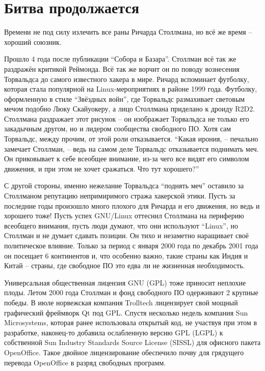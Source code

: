 

\chapter{Битва продолжается}

Времени не под силу излечить все раны Ричарда Столлмана, но всё же время -- хороший союзник.

Прошло 4 года после публикации \enquote{Собора и Базара}. Столлман всё так же раздражён критикой Реймонда. Всё так же ворчит он по поводу вознесения Торвальдса до самого известного хакера в мире. Ричард вспоминает футболку, которая стала популярной на Linux-мероприятиях в районе 1999 года. Футболку, оформленную в стиле \enquote{Звёздных войн}, где Торвальдс размахивает световым мечом подобно Люку Скайуокеру, а лицо Столлмана приделано к дроиду R2D2. Столлмана раздражает этот рисунок -- он изображает Торвальдса не только его закадычным другом, но и лидером сообщества свободного ПО. Хотя сам Торвальдс, между прочим, от этой роли отказывается. \enquote{Какая ирония, -- печально замечает Столлман, -- ведь на самом деле Торвальдс отказывается поднимать меч. Он приковывает к себе всеобщее внимание, из-за чего все видят его символом движения, и при этом не хочет сражаться. Что тут хорошего?}

С другой стороны, именно нежелание Торвальдса \enquote{поднять меч} оставило за Столлманом репутацию непримиримого стража хакерской этики. Пусть за последние годы произошло много плохого для Ричарда и его движения, но ведь и хорошего тоже! Пусть успех GNU/Linux оттеснил Столлмана на периферию всеобщего внимания, пусть люди думают, что они используют \enquote{Linux}, но Столлман и не думает сдавать позиции. Он тихо и незаметно наращивает своё политическое влияние. Только за период с января 2000 года по декабрь 2001 года он посещает 6 континентов и, что особенно важно, такие страны как Индия и Китай -- страны, где свободное ПО это едва ли не жизненная необходимость.

Универсальная общественная лицензия GNU (GPL) тоже приносит неплохие плоды. Летом 2000 года Столлман и фонд свободного ПО одерживают 2 крупные победы. В июле норвежская компания Trolltech лицензирует свой мощный графический фреймворк Qt под GPL. Спустя несколько недель компания Sun Microsystems, которая ранее использовала открытый код, не участвуя при этом в разработке, наконец-то добавила ослабленную версию GPL (LGPL) к собственной Sun Industry Standards Source License (SISSL) для офисного пакета OpenOffice. Такое двойное лицензирование обеспечило почву для грядущего перевода OpenOffice  в разряд свободных программ.

